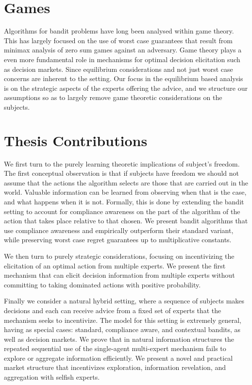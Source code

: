 \section{Games}

Algorithms for bandit problems have long been analysed within game theory.
This has largely focused on the use of worst case guarantees that result from minimax analysis of zero sum games against an adversary.
Game theory plays a even more fundamental role in mechanisms for optimal decision elicitation such as decision markets.
Since equilibrium considerations and not just worst case concerns are inherent to the setting.
Our focus in the equilibrium based analysis is on the strategic aspects of the experts offering the advice, and we structure our assumptions so as to largely remove game theoretic considerations on the subjects.

\section{Thesis Contributions}

We first turn to the purely learning theoretic implications of subject's freedom.
The first conceptual observation is that if subjects have freedom we should not assume that the actions the algorithm selects are those that are carried out in the world. Valuable information can be learned from observing when that is the case, and what happens when it is not.
Formally, this is done by extending the bandit setting to account for compliance awareness on the part of the algorithm of the action that takes place relative to that chosen.
We present bandit algorithms that use compliance awareness and empirically outperform their standard variant, while preserving worst case regret guarantees up to multiplicative constants.

We then turn to purely strategic considerations, focusing on incentivizing the elicitation of an optimal action from multiple experts.
We present the first mechanism that can elicit decision information from multiple experts without committing to taking dominated actions with positive probability.

Finally we consider a natural hybrid setting, where a sequence of subjects makes decisions and each can receive advice from a fixed set of experts that the mechanism seeks to incentivize.
The model for this setting is extremely general, having as special cases: standard, compliance aware, and contextual bandits, as well as decision markets.
We prove that in natural information structures the repeated sequential use of the single-agent multi-expert mechanism fails to explore or aggregate information efficiently.
We present a novel and practical market structure that incentivizes exploration, information revelation, and aggregation with selfish experts.



